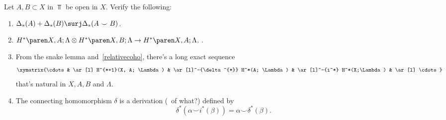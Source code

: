 \begin{todo}
Let $A, B  \subset X$ in $\Top$ be open in $X$. Verify the following:

\begin{enumerate}
   \item $\Delta_*(A) + \Delta_*(B) \surj \Delta_*(A \smile B)$.
   \item $\coho{X, A}{\Lambda} \otimes \coho{X, B}{\Lambda} \to \coho{X, A}{\Lambda}$. \label{relativecoho}.
    
   \item From the snake lemma and~\eqref{relativecoho}, there's a long exact sequence
        \[
           \xymatrix{\cdots & \ar[l] H^{*+1}(X, A; \Lambda) & \ar[l]^-{\delta^{*}} H^*(A; \Lambda) & \ar[l]^-{i^*} H^*(X;\Lambda) & \ar[l] \cdots}
        \]
        that's natural in $X, A, B$ and $\Lambda$.
        \item The connecting homomorphism $\delta$ is a derivation (\TODO\ of what?) defined by 
        \[
        \delta^*(\alpha \smile i^*(\beta)) = \alpha \smile \delta^*(\beta)
        .\]
\end{enumerate}
\end{todo}

